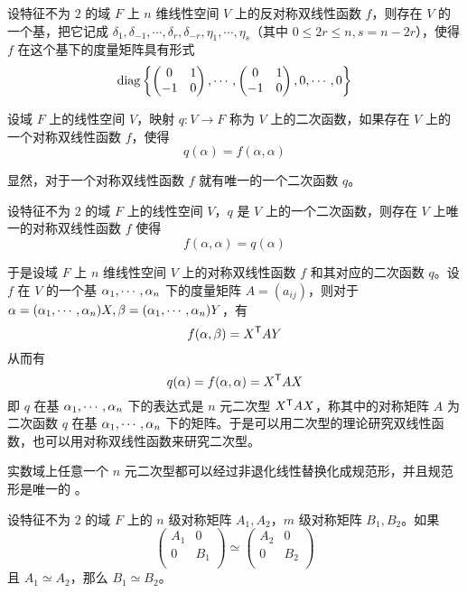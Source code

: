 \begin{theorem}
    设特征不为 $2$ 的域 $F$ 上 $n$ 维线性空间 $V$ 上的反对称双线性函数 $f$，则存在 $V$ 的一个基，把它记成 $\delta_{1},\delta_{-1},\cdots,\delta_{r},\delta_{-r},\eta_1,\cdots,\eta_s$（其中 $0 \leqslant 2r \leqslant n, s = n-2r$），使得 $f$ 在这个基下的度量矩阵具有形式
    \[ \operatorname{diag}\left\{
        \left(\begin{matrix} 0 & 1 \\ -1 & 0 \end{matrix}\right),
        \cdots,
        \left(\begin{matrix} 0 & 1 \\ -1 & 0 \end{matrix}\right),
        0,\cdots,0
        \right\} \]
\end{theorem}

\begin{definition}
    设域 $F$ 上的线性空间 $V$，映射 $q : V \to F$ 称为 $V$ 上的二次函数，如果存在 $V$ 上的一个对称双线性函数 $f$，使得
    \[ q(\alpha) = f(\alpha,\alpha) \]
\end{definition}

显然，对于一个对称双线性函数 $f$ 就有唯一的一个二次函数 $q$。

\begin{theorem}
    设特征不为 $2$ 的域 $F$ 上的线性空间 $V$，$q$ 是 $V$ 上的一个二次函数，则存在 $V$ 上唯一的对称双线性函数 $f$ 使得
    \[ f(\alpha,\alpha) = q(\alpha) \]
\end{theorem}

于是设域 $F$ 上 $n$ 维线性空间 $V$ 上的对称双线性函数 $f$ 和其对应的二次函数 $q$。设 $f$ 在 $V$ 的一个基 $\alpha_1,\cdots,\alpha_n$ 下的度量矩阵 $A = (a_{ij})$，则对于 $\alpha = (\alpha_1,\cdots,\alpha_n)X,\beta = (\alpha_1,\cdots,\alpha_n)Y$，有
\[ f(\alpha,\beta) = {X}^\mathsf{T}AY \]
从而有
\[ q(\alpha) = f(\alpha,\alpha) = {X}^\mathsf{T}AX \]
即 $q$ 在基 $\alpha_1,\cdots,\alpha_n$ 下的表达式是 $n$ 元二次型 ${X}^\mathsf{T}AX$，称其中的对称矩阵 $A$ 为二次函数 $q$ 在基 $\alpha_1,\cdots,\alpha_n$ 下的矩阵。于是可以用二次型的理论研究双线性函数，也可以用对称双线性函数来研究二次型。

\begin{theorem}[惯性定理]
    实数域上任意一个 $n$ 元二次型都可以经过非退化线性替换化成规范形，并且规范形是唯一的 。
\end{theorem}

\begin{theorem}
    设特征不为 $2$ 的域 $F$ 上的 $n$ 级对称矩阵 $A_1,A_2$，$m$ 级对称矩阵 $B_1,B_2$。如果
    \[ \left(\begin{matrix}
                A_1 & 0   \\
                0   & B_1 \\
            \end{matrix}\right) \simeq \left(\begin{matrix}
                A_2 & 0   \\
                0   & B_2 \\
            \end{matrix}\right) \]
    且 $A_1 \simeq A_2$，那么 $B_1 \simeq B_2$。
\end{theorem}

